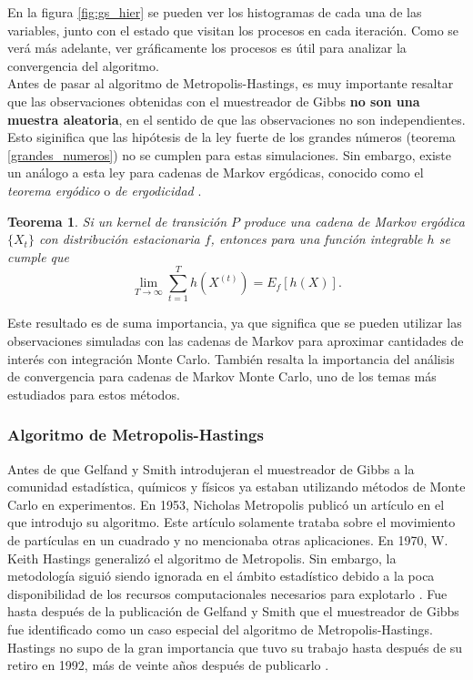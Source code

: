 \documentclass[11pt,a4paper]{article}
\newtheorem{theorem}{Teorema}[section]
\begin{document}
En la figura \ref{fig:gs_hier} se pueden ver los histogramas de cada una de las variables, junto con el estado que visitan los procesos en cada iteración. Como se verá más adelante, ver gráficamente los procesos es útil para analizar la convergencia del algoritmo.\\

Antes de pasar al algoritmo de Metropolis-Hastings, es muy importante resaltar que las observaciones obtenidas con el muestreador de Gibbs \textbf{no son una muestra aleatoria}, en el sentido de que las observaciones no son independientes. Esto siginifica que las hipótesis de la ley fuerte de los grandes números (teorema \ref{grandes_numeros}) no se cumplen para estas simulaciones. Sin embargo, existe un análogo a esta ley para cadenas de Markov ergódicas, conocido como el \textit{teorema ergódico} o \textit{de ergodicidad} \citep{casella}.

\begin{theorem}
Si un kernel de transición $P$ produce una cadena de Markov ergódica $\lbrace X_t \rbrace$ con distribución estacionaria $f$, entonces para una función integrable $h$ se cumple que
\begin{equation}
\lim_{T \to \infty} \sum_{t = 1}^T h(X^{(t)}) = E_f[h(X)].
\end{equation}
\end{theorem}


Este resultado es de suma importancia, ya que significa que se pueden utilizar las observaciones simuladas con las cadenas de Markov para aproximar cantidades de interés con integración Monte Carlo. También resalta la importancia del análisis de convergencia para cadenas de Markov Monte Carlo, uno de los temas más estudiados para estos métodos.\\

\subsubsection*{Algoritmo de Metropolis-Hastings}
\label{sec:mh}

Antes de que Gelfand y Smith introdujeran el muestreador de Gibbs a la comunidad estadística, químicos y físicos ya estaban utilizando métodos de Monte Carlo en experimentos. En 1953, Nicholas Metropolis publicó un artículo en el que introdujo su algoritmo. Este artículo solamente trataba sobre el movimiento de partículas en un cuadrado y no mencionaba otras aplicaciones. En 1970, W. Keith Hastings generalizó el algoritmo de Metropolis. Sin embargo, la metodología siguió siendo ignorada en el ámbito estadístico debido a la poca disponibilidad de los recursos computacionales necesarios para explotarlo \citep{bertsch}. Fue hasta después de la publicación de Gelfand y Smith que el muestreador de Gibbs fue identificado como un caso especial del algoritmo de Metropolis-Hastings. Hastings no supo de la gran importancia que tuvo su trabajo hasta después de su retiro en 1992, más de veinte años después de publicarlo \citep{bertsch}.\\
\end{document}
